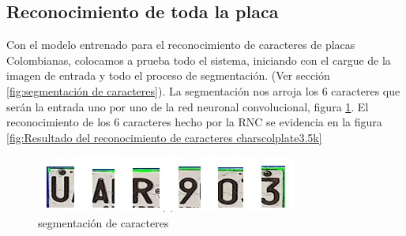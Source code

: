 




\subsection{Reconocimiento de toda la placa}

Con el modelo entrenado para el reconocimiento de caracteres de placas Colombianas, colocamos a prueba todo el sistema, iniciando con el cargue de la imagen de entrada y todo el proceso de segmentación. (Ver sección \ref{fig:segmentación de caracteres}). La segmentación nos arroja los 6 caracteres que ser\'an la entrada uno por uno de la red neuronal convolucional, figura \ref{fig:segmentación de caracteres1}. El reconocimiento de los 6 caracteres hecho por la RNC se evidencia en la figura \ref{fig:Resultado del reconocimiento de caracteres charscolplate3.5k} 

\begin{figure}[H]
\centering
\includegraphics[width=0.7\linewidth]{imagenes/MODELO_4/segmentacion/segmentacion_figura2.jpg} \caption{segmentación de caracteres}
\label{fig:segmentación de caracteres1}
\end{figure}


